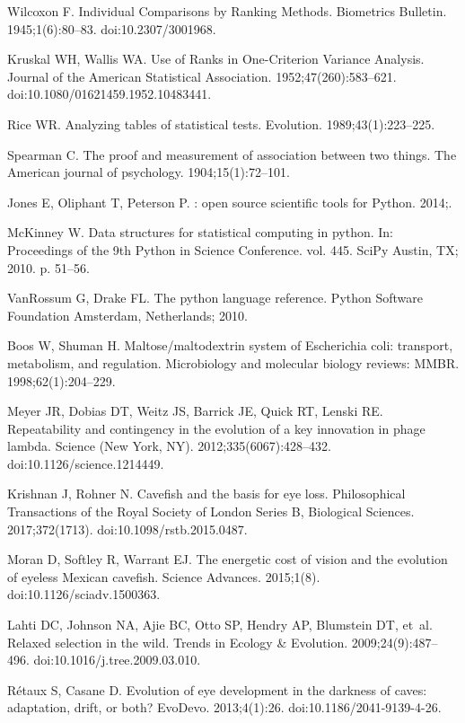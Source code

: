 \documentclass[10pt,letterpaper,final]{article}
\begin{document}
\begin{thebibliography}{10}
Wilcoxon F.
\newblock Individual {Comparisons} by {Ranking} {Methods}.
\newblock Biometrics Bulletin. 1945;1(6):80--83.
\newblock doi:{10.2307/3001968}.

Kruskal WH, Wallis WA.
\newblock Use of {Ranks} in {One}-{Criterion} {Variance} {Analysis}.
\newblock Journal of the American Statistical Association.
  1952;47(260):583--621.
\newblock doi:{10.1080/01621459.1952.10483441}.

Rice WR.
\newblock Analyzing tables of statistical tests.
\newblock Evolution. 1989;43(1):223--225.

Spearman C.
\newblock The proof and measurement of association between two things.
\newblock The American journal of psychology. 1904;15(1):72--101.

Jones E, Oliphant T, Peterson P.
: open source scientific tools for {Python}. 2014;.

McKinney W.
\newblock Data structures for statistical computing in python.
\newblock In: Proceedings of the 9th {Python} in {Science} {Conference}. vol.
  445. SciPy Austin, TX; 2010. p. 51--56.

VanRossum G, Drake FL.
\newblock The python language reference.
\newblock Python Software Foundation Amsterdam, Netherlands; 2010.

Boos W, Shuman H.
\newblock Maltose/maltodextrin system of {Escherichia} coli: transport,
  metabolism, and regulation.
\newblock Microbiology and molecular biology reviews: MMBR.
  1998;62(1):204--229.

Meyer JR, Dobias DT, Weitz JS, Barrick JE, Quick RT, Lenski RE.
\newblock Repeatability and contingency in the evolution of a key innovation in
  phage lambda.
\newblock Science (New York, NY). 2012;335(6067):428--432.
\newblock doi:{10.1126/science.1214449}.

Krishnan J, Rohner N.
\newblock Cavefish and the basis for eye loss.
\newblock Philosophical Transactions of the Royal Society of London Series B,
  Biological Sciences. 2017;372(1713).
\newblock doi:{10.1098/rstb.2015.0487}.

Moran D, Softley R, Warrant EJ.
\newblock The energetic cost of vision and the evolution of eyeless {Mexican}
  cavefish.
\newblock Science Advances. 2015;1(8).
\newblock doi:{10.1126/sciadv.1500363}.

Lahti DC, Johnson NA, Ajie BC, Otto SP, Hendry AP, Blumstein DT, et~al.
\newblock Relaxed selection in the wild.
\newblock Trends in Ecology \& Evolution. 2009;24(9):487--496.
\newblock doi:{10.1016/j.tree.2009.03.010}.

Rétaux S, Casane D.
\newblock Evolution of eye development in the darkness of caves: adaptation,
  drift, or both?
\newblock EvoDevo. 2013;4(1):26.
\newblock doi:{10.1186/2041-9139-4-26}.

\end{thebibliography}
\end{document}
